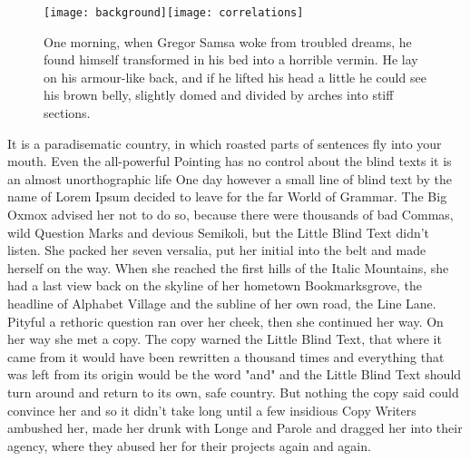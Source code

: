 \documentclass[12pt,english]{article}
\begin{document}
\begin{figure}[h]
\centering{}\texttt{[image: background]}\texttt{[image: correlations]}{\scriptsize{\caption{One morning, when Gregor Samsa woke from troubled dreams, he found himself 
transformed in his bed into a horrible vermin. He lay on his armour-like back, and 
if he lifted his head a little he could see his brown belly, slightly domed and divided 
by arches into stiff sections.}
}}
\end{figure}

It is a paradisematic country, in which roasted parts of sentences fly into your mouth. 
Even the all-powerful Pointing has no control about the blind texts it is an almost 
unorthographic life One day however a small line of blind text by the name of 
Lorem Ipsum decided to leave for the far World of Grammar. The Big Oxmox 
advised her not to do so, because there were thousands of bad Commas, wild 
Question Marks and devious Semikoli, but the Little Blind Text didn't listen. She 
packed her seven versalia, put her initial into the belt and made herself on the 
way. When she reached the first hills of the Italic Mountains, she had a last view 
back on the skyline of her hometown Bookmarksgrove, the headline of Alphabet 
Village and the subline of her own road, the Line Lane. Pityful a rethoric question 
ran over her cheek, then she continued her way. On her way she met a copy. The 
copy warned the Little Blind Text, that where it came from it would have been 
rewritten a thousand times and everything that was left from its origin would be 
the word "and" and the Little Blind Text should turn around and return to its own, 
safe country. But nothing the copy said could convince her and so it didn't take 
long until a few insidious Copy Writers ambushed her, made her drunk with Longe 
and Parole and dragged her into their agency, where they abused her for their 
projects again and again.
\end{document}
